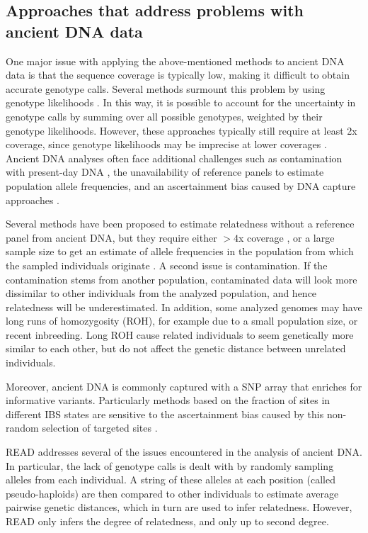 \documentclass[12pt, letterpaper]{article}
\begin{document}
\subsection{Approaches that address problems with ancient DNA data}
One major issue with applying the above-mentioned methods to ancient DNA data is that the sequence coverage is typically low, making it difficult to obtain accurate genotype calls.
Several methods surmount this problem by using genotype likelihoods \cite{lipatov_maximum_2015,korneliussen_ngsrelate_2015}. In this way, it is possible to account for the uncertainty in genotype calls by summing over all possible genotypes, weighted by their genotype likelihoods. However, these approaches typically still require at least 2x coverage, since genotype likelihoods may be imprecise at lower coverages \cite{korneliussen_angsd_2014} . Ancient DNA analyses often face additional challenges such as contamination with present-day DNA \cite{peyregne_present-day_2020-1}, the unavailability of  reference panels to estimate population allele frequencies, and an ascertainment bias caused by  DNA capture approaches \cite{prufer_computational_2010, vai_kinship_2020}.

Several methods have been proposed to estimate relatedness without a reference panel from ancient DNA, but they  require either $>4$x coverage \cite{waples_allele_2019}, or a large sample size to get an estimate of allele frequencies in the population from which the sampled individuals originate \cite{theunert_joint_2017}. A second issue is contamination. If the contamination stems from another population, contaminated data will look more dissimilar to other individuals from the analyzed population, and hence relatedness will be underestimated. In addition, some analyzed  genomes may have long runs of homozygosity (ROH), for example due to a small population size, or recent inbreeding. Long ROH cause related individuals to seem genetically more similar to each other, but do not affect the genetic distance between unrelated individuals.

Moreover, ancient DNA is commonly captured with a SNP array that enriches for informative variants. Particularly methods based on the fraction of sites in different IBS states are sensitive to the ascertainment bias caused by this non-random selection of targeted sites \cite{waples_allele_2019}. 

READ \cite{kuhn_estimating_2018} addresses several of the issues encountered in the analysis of ancient DNA. In particular, the lack of  genotype calls is dealt with by randomly sampling alleles from each individual. A string of these alleles at each position (called pseudo-haploids) are then compared to other individuals to estimate  average pairwise genetic distances, which in turn are used to infer relatedness. However, READ only infers the degree of relatedness, and only up to second degree.
\end{document}
